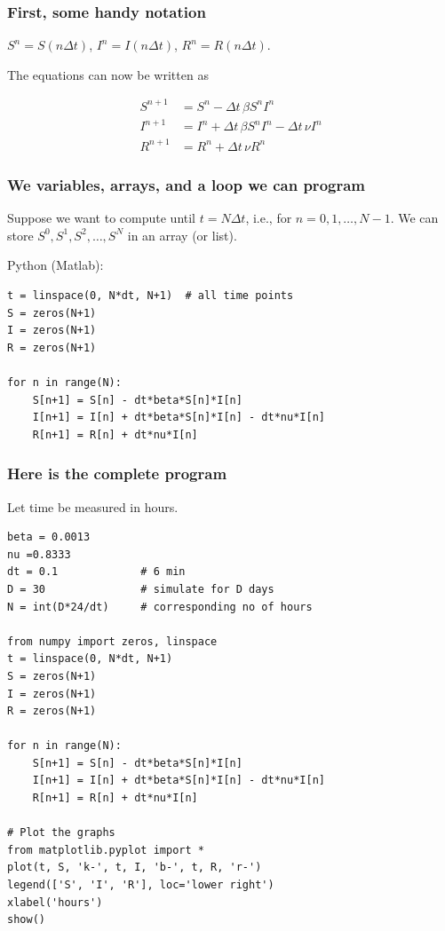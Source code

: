 \documentclass{beamer}
\begin{document}
\begin{frame}
\frametitle{First, some handy notation}

$S^n = S(n\Delta t)$,
$I^n = I(n\Delta t)$, $R^n = R(n\Delta t)$.

The equations can now be written as

\begin{align}
S^{n+1} &= S^n - \Delta t\,\beta S^nI^n
\label{SIR1:Sc}\\
I^{n+1} &= I^n + \Delta t\,\beta S^nI^n -\Delta t\,\nu I^n
\label{SIR1:Ic}\\
R^{n+1} &= R^n + \Delta t\,\nu R^n
\label{SIR1:Rc}
\end{align}
\end{frame}

\begin{frame}
\frametitle{We variables, arrays, and a loop we can program}

Suppose we want to compute until $t=N\Delta t$, i.e., for $n=0,1,\ldots,N-1$.
We can store $S^0, S^1, S^2, \ldots, S^N$ in an array (or list).

Python (Matlab):

\begin{verbatim}
t = linspace(0, N*dt, N+1)  # all time points
S = zeros(N+1)
I = zeros(N+1)
R = zeros(N+1)

for n in range(N):
    S[n+1] = S[n] - dt*beta*S[n]*I[n]
    I[n+1] = I[n] + dt*beta*S[n]*I[n] - dt*nu*I[n]
    R[n+1] = R[n] + dt*nu*I[n]
\end{verbatim}
\end{frame}

\begin{frame}
\frametitle{Here is the complete program}

Let time be measured in hours.

\begin{verbatim}
beta = 0.0013
nu =0.8333
dt = 0.1             # 6 min
D = 30               # simulate for D days
N = int(D*24/dt)     # corresponding no of hours

from numpy import zeros, linspace
t = linspace(0, N*dt, N+1)
S = zeros(N+1)
I = zeros(N+1)
R = zeros(N+1)

for n in range(N):
    S[n+1] = S[n] - dt*beta*S[n]*I[n]
    I[n+1] = I[n] + dt*beta*S[n]*I[n] - dt*nu*I[n]
    R[n+1] = R[n] + dt*nu*I[n]

# Plot the graphs
from matplotlib.pyplot import *
plot(t, S, 'k-', t, I, 'b-', t, R, 'r-')
legend(['S', 'I', 'R'], loc='lower right')
xlabel('hours')
show()
\end{verbatim}
\end{frame}
\end{document}
